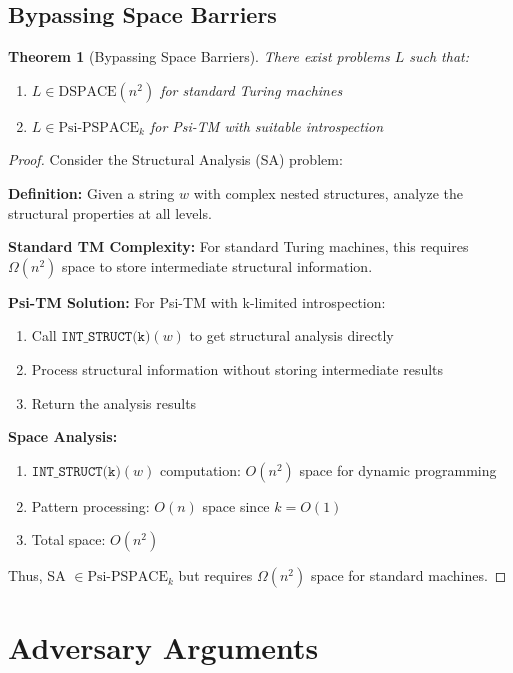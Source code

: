 \documentclass[11pt]{article}
\newtheorem{theorem}{Theorem}
\begin{document}
\subsection{Bypassing Space Barriers}

\begin{theorem}[Bypassing Space Barriers]
There exist problems $L$ such that:
\begin{enumerate}
\item $L \in \text{DSPACE}(n^2)$ for standard Turing machines
\item $L \in \text{Psi-PSPACE}_k$ for Psi-TM with suitable introspection
\end{enumerate}
\end{theorem}

\begin{proof}
Consider the Structural Analysis (SA) problem:

\textbf{Definition:} Given a string $w$ with complex nested structures, analyze the structural properties at all levels.

\textbf{Standard TM Complexity:}
For standard Turing machines, this requires $\Omega(n^2)$ space to store intermediate structural information.

\textbf{Psi-TM Solution:}
For Psi-TM with k-limited introspection:
\begin{enumerate}
\item Call $\texttt{INT\_STRUCT(k)}(w)$ to get structural analysis directly
\item Process structural information without storing intermediate results
\item Return the analysis results
\end{enumerate}

\textbf{Space Analysis:}
\begin{enumerate}
\item $\texttt{INT\_STRUCT(k)}(w)$ computation: $O(n^2)$ space for dynamic programming
\item Pattern processing: $O(n)$ space since $k = O(1)$
\item Total space: $O(n^2)$
\end{enumerate}

Thus, SA $\in \text{Psi-PSPACE}_k$ but requires $\Omega(n^2)$ space for standard machines.
\end{proof}

\section{Adversary Arguments}
\end{document}
